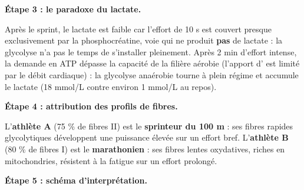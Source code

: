 \documentclass[11pt]{article}
\begin{document}
\begin{exoresolu}
\textbf{Étape 3 : le paradoxe du lactate.}

Après le sprint, le lactate est faible car l'effort de 10 s est couvert presque exclusivement par la phosphocréatine, voie qui ne produit \textbf{pas} de lactate : la glycolyse n'a pas le temps de s'installer pleinement. Après 2 min d'effort intense, la demande en ATP dépasse la capacité de la filière aérobie (l'apport d' est limité par le débit cardiaque) : la glycolyse anaérobie tourne à plein régime et accumule le lactate (18 mmol/L contre environ 1 mmol/L au repos).

\textbf{Étape 4 : attribution des profils de fibres.}

L'\textbf{athlète A} (75 \% de fibres II) est le \textbf{sprinteur du 100 m} : ses fibres rapides glycolytiques développent une puissance élevée sur un effort bref. L'\textbf{athlète B} (80 \% de fibres I) est le \textbf{marathonien} : ses fibres lentes oxydatives, riches en mitochondries, résistent à la fatigue sur un effort prolongé.

\textbf{Étape 5 : schéma d'interprétation.}


\end{exoresolu}
\end{document}
